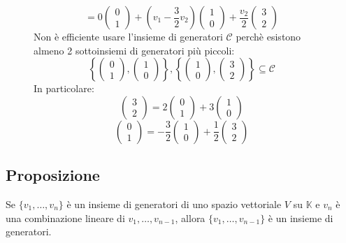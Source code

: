 \documentclass[a4paper]{article}
\theoremstyle{break}
\theoremstyle{break}
\theoremstyle{break}
\theoremstyle{break}
\begin{document}
\begin{figure}[H]
\begin{example}
\[    \]
    \[
    = 0 \begin{pmatrix} 0\\1 \end{pmatrix} 
    +
    (v_1-\frac{3}{2}v_2) \begin{pmatrix} 1\\0 \end{pmatrix}
    +
    \frac{v_2}{2} \begin{pmatrix} 3\\2 \end{pmatrix}
    \] 
    Non è efficiente usare l'insieme di generatori \( \mathcal{C} \) perchè esistono
    almeno 2 sottoinsiemi di generatori più piccoli:
    \[
    \left\{ \begin{pmatrix} 0\\1 \end{pmatrix}, \begin{pmatrix} 1\\0 \end{pmatrix}  \right\},
    \left\{ \begin{pmatrix} 1\\0 \end{pmatrix}, \begin{pmatrix} 3\\2 \end{pmatrix}  \right\}
    \subseteq \mathcal{C}
    \] 
    In particolare:
    \[
    \begin{pmatrix} 3\\2 \end{pmatrix} = 2 \begin{pmatrix} 0\\1 \end{pmatrix} +
    3 \begin{pmatrix} 1\\0 \end{pmatrix}
    \] 
    \[
    \begin{pmatrix} 0\\1 \end{pmatrix} = -\frac{3}{2} \begin{pmatrix} 1\\0 \end{pmatrix} +
    \frac{1}{2} \begin{pmatrix} 3\\2 \end{pmatrix}
    \] 
  \end{example}
\end{figure}

\subsection{Proposizione}
\label{prop:generatori}
Se \( \{v_1, \ldots, v_n\}  \) è un insieme di generatori di uno spazio vettoriale \( V \) 
su \( \mathbb{K} \) e \( v_n \) è una combinazione lineare di \( v_1, \ldots, v_{n-1} \),
allora \( \{v_1, \ldots, v_{n-1}\}  \) è un insieme di generatori.
\end{document}
